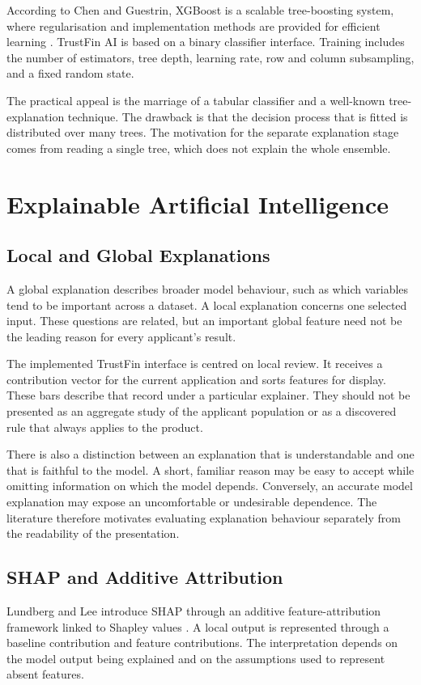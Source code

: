According to Chen and Guestrin, XGBoost is a scalable tree-boosting system, where regularisation and implementation methods are provided for efficient learning \cite{chen2016}. TrustFin AI is based on a binary classifier interface. Training includes the number of estimators, tree depth, learning rate, row and column subsampling, and a fixed random state.

The practical appeal is the marriage of a tabular classifier and a well-known tree-explanation technique. The drawback is that the decision process that is fitted is distributed over many trees. The motivation for the separate explanation stage comes from reading a single tree, which does not explain the whole ensemble.

\section{Explainable Artificial Intelligence}
\subsection{Local and Global Explanations}
A global explanation describes broader model behaviour, such as which variables tend to be important across a dataset. A local explanation concerns one selected input. These questions are related, but an important global feature need not be the leading reason for every applicant's result.

The implemented TrustFin interface is centred on local review. It receives a contribution vector for the current application and sorts features for display. These bars describe that record under a particular explainer. They should not be presented as an aggregate study of the applicant population or as a discovered rule that always applies to the product.

There is also a distinction between an explanation that is understandable and one that is faithful to the model. A short, familiar reason may be easy to accept while omitting information on which the model depends. Conversely, an accurate model explanation may expose an uncomfortable or undesirable dependence. The literature therefore motivates evaluating explanation behaviour separately from the readability of the presentation.

\subsection{SHAP and Additive Attribution}
Lundberg and Lee introduce SHAP through an additive feature-attribution framework linked to Shapley values \cite{lundberg2017}. A local output is represented through a baseline contribution and feature contributions. The interpretation depends on the model output being explained and on the assumptions used to represent absent features.

